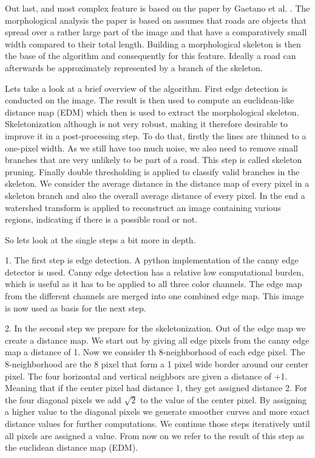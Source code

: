 \documentclass[10pt,conference,compsocconf]{IEEEtran}
\begin{document}
Out last, and most complex feature is based on the paper by Gaetano et al. \cite{GaZeScPo11}. The morphological analysis the paper is based on assumes that roads are objects that spread over a rather large part of the image and that have a comparatively small width compared to their total length. Building a morphological skeleton is then the base of the algorithm and consequently for this feature. Ideally a road can afterwards be approximately represented by a branch of the skeleton.

Lets take a look at a brief overview of the algorithm. First edge detection is conducted on the image. The result is then used to compute an euclidean-like distance map (EDM) which then is used to extract the morphological skeleton. Skeletonization although is not very robust, making it therefore desirable to improve it in a post-processing step. To do that, firstly the lines are thinned to a one-pixel width. As we still have too much noise, we also need to remove small branches that are very unlikely to be part of a road. This step is called skeleton pruning. Finally double thresholding is applied to classify valid branches in the skeleton. We consider the average distance in the distance map of every pixel in a skeleton branch and also the overall average distance of every pixel. In the end a watershed transform is applied to reconstruct an image containing various regions, indicating if there is a possible road or not.


So lets look at the single steps a bit more in depth.

1. The first step is edge detection. A python implementation of the canny edge detector is used. Canny edge detection has a relative low computational burden, which is useful as it has to be applied to all three color channels. The edge map from the different channels are merged into one combined edge map. This image is now used as basis for the next step.

2. In the second step we prepare for the skeletonization. Out of the edge map we create a distance map. 
We start out by giving all edge pixels from the canny edge map a distance of 1. Now we consider th 8-neighborhood of each edge pixel. The 8-neighborhood are the 8 pixel that form a 1 pixel wide border around our center pixel. The four horizontal and vertical neighbors are given a distance of +1. Meaning that if the center pixel had distance 1, they get assigned distance 2. For the four diagonal pixels we add $\sqrt{2}$ to the value of the center pixel. By assigning a higher value to the diagonal pixels we generate smoother curves and more exact distance values for further computations. We continue those steps iteratively until all pixels are assigned a value. From now on we refer to the result of this step as the euclidean distance map (EDM).
\end{document}
